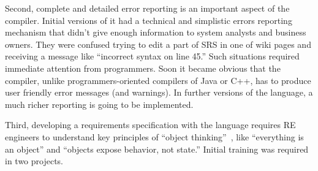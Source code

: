 \documentclass[sigplan,10pt,nonacm=true]{acmart}
\begin{document}
Second, complete and detailed error reporting is an important aspect of
the compiler. Initial versions of it had a technical and simplistic
errors reporting mechanism that didn't give enough information to system
analysts and business owners. They were confused trying to edit a part of
SRS in one of wiki pages and receiving a message like ``incorrect syntax on
line 45.'' Such situations required immediate attention from
programmers. Soon it became obvious that the compiler, unlike
programmers-oriented compilers of Java or C++, has to produce user friendly
error messages (and warnings). In further versions of the language, a much richer
reporting is going to be implemented.

Third, developing a requirements specification with the language requires RE
engineers to understand key principles of ``object thinking''~\citep{west04},
like ``everything is an object'' and ``objects expose behavior, not state.''
Initial training was required in two projects.


\raggedright

\clearpage
\end{document}
